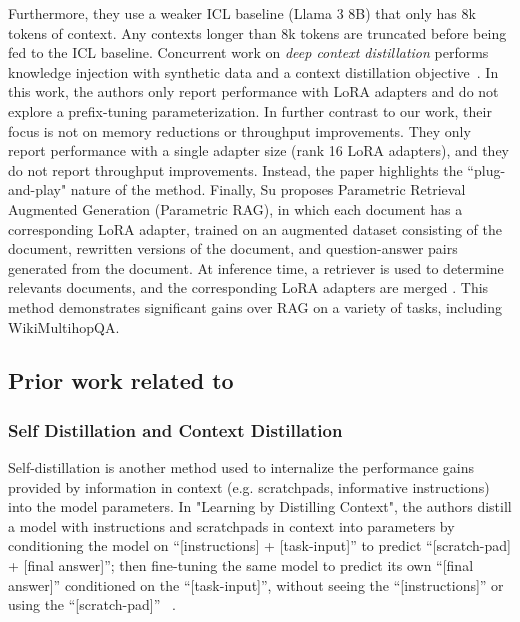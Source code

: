 Furthermore, they use a weaker ICL baseline (Llama 3 8B) that only has 8k tokens of context. Any contexts longer than 8k tokens are truncated before being fed to the ICL baseline.
Concurrent work on \textit{deep context distillation} performs knowledge injection with synthetic data and a context distillation objective~\cite{caccia2025training}.
In this work, the authors only report performance with LoRA adapters and do not explore a prefix-tuning parameterization.
In further contrast to our work, their focus is not on memory reductions or throughput improvements. They only report performance with a single adapter size (rank 16 LoRA adapters), and they do not report throughput improvements. Instead, the paper highlights the ``plug-and-play" nature of the method.
Finally, Su \etal proposes Parametric Retrieval Augmented Generation (Parametric RAG), in which each document has a corresponding LoRA adapter, trained on an augmented dataset consisting of the document, rewritten versions of the document, and question-answer pairs generated from the document. At inference time, a retriever is used to determine relevants documents, and the corresponding LoRA adapters are merged \cite{su2025parametricrag}. This method demonstrates significant gains over RAG on a variety of tasks, including WikiMultihopQA.
\subsection{Prior work related to \method}
\label{app:related-work-method}
\subsubsection{Self Distillation and Context Distillation}
Self-distillation is another method used to internalize the performance gains provided by information in context (e.g. scratchpads, informative instructions) into the model parameters. In "Learning by Distilling Context", the authors distill a model with instructions and scratchpads in context into parameters  by conditioning the model on “[instructions] + [task-input]” to predict “[scratch-pad] + [final answer]”; then fine-tuning the same model to predict its own “[final answer]” conditioned on the “[task-input]”, without seeing the “[instructions]” or using the “[scratch-pad]” ~\cite{snell2024scaling}.

